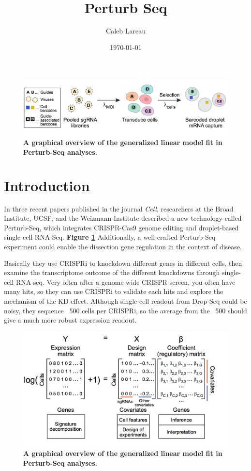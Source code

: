 \documentclass{article}\usepackage[]{graphicx}\usepackage[]{color}
\title{Perturb Seq}
\author{Caleb Lareau}
\date{\today}
\begin{document}
\maketitle

\begin{figure}[ht]
    \centering
    \includegraphics[width=\textwidth]{overview.png}
    \caption{\textbf{A graphical overview of the generalized linear model fit in Perturb-Seq analyses.} \newline \newline
    \label{fig:overview}}
\end{figure}

\section*{Introduction}
In three recent papers published in the journal \textit{Cell}, researchers at the Broad Institute, UCSF, and the Weizmann Institute described a new technology called Perturb-Seq, which integrates CRISPR-Cas9 genome editing and droplet-based single-cell RNA-Seq. \textbf{Figure \ref{fig:overview}} Additionally, a well-crafted Perturb-Seq experiment could enable the dissection gene regulation in the context of disease.


 Basically they use CRISPRi to knockdown different genes in different cells, then examine the transcriptome outcome of the different knockdowns through single-cell RNA-seq. Very often after a genome-wide CRISPR screen, you often have many hits, so they can use CRISPRi to validate each hits and explore the mechanism of the KD effect. Although single-cell readout from Drop-Seq could be noisy, they sequence ~500 cells per CRISPRi, so the average from the ~500 should give a much more robust expression readout. 

\begin{figure}[ht]
    \centering
    \includegraphics[width=\textwidth]{model.png}
    \caption{\textbf{A graphical overview of the generalized linear model fit in Perturb-Seq analyses.}}
     \label{fig:model}
\end{figure}
\end{document}
